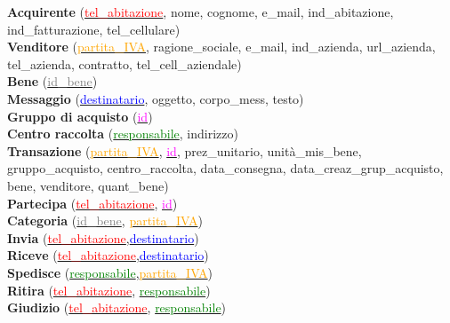 \documentclass[a4paper, 10pt]{report}
\begin{document}
\raggedright
\textbf{Acquirente} (\underline{\textcolor{red}{tel\_abitazione}}, nome, cognome, e\_mail, ind\_abitazione, ind\_fatturazione, tel\_cellulare)\\
\textbf{Venditore} (\underline{\textcolor{orange}{partita\_IVA}}, ragione\_sociale, e\_mail, ind\_azienda, url\_azienda, tel\_azienda, contratto, tel\_cell\_aziendale)\\
\textbf{Bene} (\underline{\textcolor{gray}{id\_bene}})\\
\textbf{Messaggio} (\underline{\textcolor{blue}{destinatario}}, oggetto, corpo\_mess, testo)\\
\textbf{Gruppo di acquisto} (\underline{\textcolor{magenta}{id}})\\
\textbf{Centro raccolta} (\underline{\textcolor{green}{responsabile}}, indirizzo)\\
\textbf{Transazione} (\underline{\textcolor{orange}{partita\_IVA}}, \underline{\textcolor{magenta}{id}}, prez\_unitario, unit\`a\_mis\_bene, gruppo\_acquisto, centro\_raccolta, data\_consegna, data\_creaz\_grup\_acquisto, bene, venditore, quant\_bene)\\
\textbf{Partecipa} (\underline{\textcolor{red}{tel\_abitazione}}, \underline{\textcolor{magenta}{id}})\\
\textbf{Categoria} (\underline{\textcolor{gray}{id\_bene}}, \underline{\textcolor{orange}{partita\_IVA}})\\
\textbf{Invia} (\underline{\textcolor{red}{tel\_abitazione}},\underline{\textcolor{blue}{destinatario}})\\
\textbf{Riceve} (\underline{\textcolor{red}{tel\_abitazione}},\underline{\textcolor{blue}{destinatario}})\\
\textbf{Spedisce} (\underline{\textcolor{green}{responsabile}},\underline{\textcolor{orange}{partita\_IVA}})\\
\textbf{Ritira} (\underline{\textcolor{red}{tel\_abitazione}}, \underline{\textcolor{green}{responsabile}})\\
\textbf{Giudizio} (\underline{\textcolor{red}{tel\_abitazione}}, \underline{\textcolor{green}{responsabile}})\\
\end{document}
